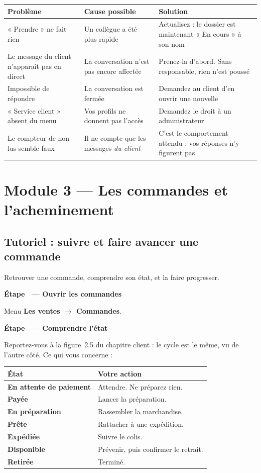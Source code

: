 \documentclass[11pt,a4paper]{report}
\newcounter{etape}[section]
\newcommand{\etape}[1]{%
  \stepcounter{etape}%
  \vspace{9pt}%
  \noindent{\color{garahPrimaire}\rule{3pt}{13pt}}\hspace{6pt}%
  {\bfseries\large Étape \theetape\ --- #1}\par\vspace{4pt}%
}
\begin{document}
\begin{longtable}{@{}p{4cm} p{4cm} p{6.2cm}@{}}
\toprule
\bfseries Problème & \bfseries Cause possible & \bfseries Solution \\
\midrule
\endhead
« Prendre » ne fait rien
  & Un collègue a été plus rapide
  & Actualisez : le dossier est maintenant « En cours » à son nom \\[4pt]
Le message du client n'apparaît pas en direct
  & La conversation n'est pas encore affectée
  & Prenez-la d'abord. Sans responsable, rien n'est poussé \\[4pt]
Impossible de répondre
  & La conversation est fermée
  & Demandez au client d'en ouvrir une nouvelle \\[4pt]
« Service client » absent du menu
  & Vos profils ne donnent pas l'accès
  & Demandez le droit à un administrateur \\[4pt]
Le compteur de non lus semble faux
  & Il ne compte que les messages \emph{du client}
  & C'est le comportement attendu : vos réponses n'y figurent pas \\
\bottomrule
\end{longtable}

\section{Module 3 — Les commandes et l'acheminement}

\subsection{Tutoriel : suivre et faire avancer une commande}

\begin{objectif}
Retrouver une commande, comprendre son état, et la faire progresser.
\end{objectif}

\etape{Ouvrir les commandes}

Menu \textbf{Les ventes $\rightarrow$ Commandes}.

\etape{Comprendre l'état}

Reportez-vous à la figure~2.5 du chapitre client : le cycle est le même, vu de
l'autre côté. Ce qui vous concerne :

\begin{center}
\begin{tabular}{@{}>{\bfseries}p{3.8cm} p{11cm}@{}}
\toprule
État & Votre action \\
\midrule
En attente de paiement & Attendre. Ne préparez rien. \\
Payée & Lancer la préparation. \\
En préparation & Rassembler la marchandise. \\
Prête & Rattacher à une expédition. \\
Expédiée & Suivre le colis. \\
Disponible & Prévenir, puis confirmer le retrait. \\
Retirée & Terminé. \\
\bottomrule
\end{tabular}
\end{center}
\end{document}
